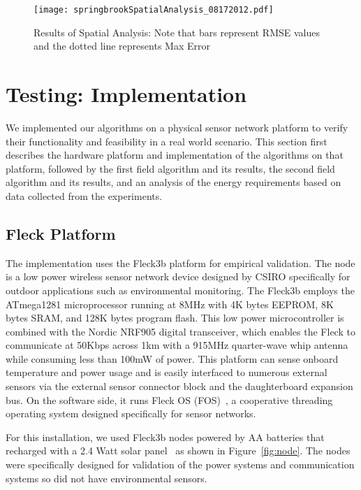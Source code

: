 \documentclass[prodmode,acmtosn]{acmsmall}
\begin{document}
 
 \begin{figure}[htb]
\centering
\texttt{[image: springbrookSpatialAnalysis\_08172012.pdf]}
\caption{Results of Spatial Analysis: Note that bars represent RMSE values and the dotted line represents Max Error}
\label{fig:spatialAnalysis}
\end{figure}

\section{Testing: Implementation} \label{sec:solar-implement}
We implemented our algorithms on a physical sensor network platform to verify their functionality and feasibility in a real world scenario.
This section first describes the hardware platform and implementation of the algorithms on that platform, followed by the first field algorithm and its results, the second field algorithm and its results, and an analysis of the energy requirements based on data collected from the experiments.

\subsection{Fleck Platform} 
The implementation uses the Fleck\texttrademark3b platform for empirical validation.
The node is a low power wireless sensor network device designed by CSIRO specifically for outdoor applications such as environmental monitoring. 
The Fleck\texttrademark3b employs the ATmega1281 microprocessor running at 8MHz with 4K bytes EEPROM, 8K bytes SRAM, and 128K bytes program flash.
This low power microcontroller is combined with the Nordic NRF905 digital transceiver, which enables the Fleck to communicate at 50Kbps across 1km with a 915MHz quarter-wave whip antenna while consuming less than 100mW of power.
This platform can sense onboard temperature and power usage and is easily interfaced to numerous external sensors via the external sensor connector block and the daughterboard expansion bus.
On the software side, it runs Fleck OS (FOS)~\cite{corkeEWSN2008}, a cooperative threading operating system designed specifically for sensor networks.

For this installation, we used Fleck\texttrademark3b nodes powered by AA batteries that recharged with a 2.4 Watt solar panel~\cite{Corke_pieee10} as shown in Figure~\ref{fig:node}.
The nodes were specifically designed for validation of the power systems and communication systems so did not have environmental sensors.
\end{document}
